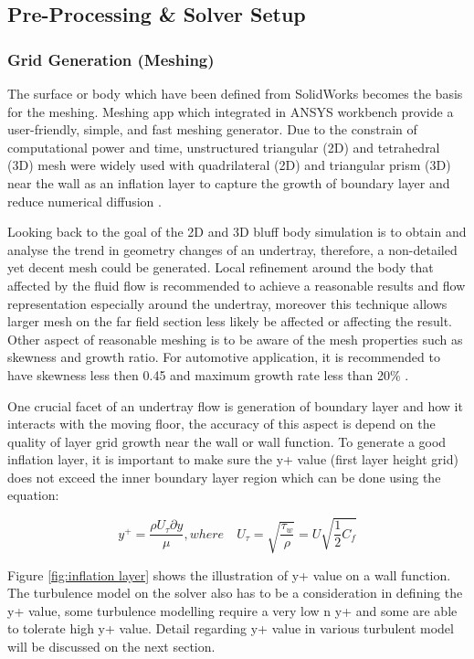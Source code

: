 \subsection{Pre-Processing \& Solver Setup}

\subsubsection{Grid Generation (Meshing)}
The surface or body which have been defined from SolidWorks becomes the basis for the meshing. Meshing app which integrated in ANSYS workbench provide a user-friendly, simple, and fast meshing generator. Due to the constrain of computational power and time, unstructured triangular (2D) and tetrahedral (3D) mesh were widely used with quadrilateral (2D) and triangular prism (3D) near the wall as an inflation layer to capture the growth of boundary layer and reduce numerical diffusion \cite{Lanfrit2005BestFLUENT}.

\noindent Looking back to the goal of the 2D and 3D bluff body simulation is to obtain and analyse the trend in geometry changes of an undertray, therefore, a non-detailed yet decent mesh could be generated. Local refinement around the body that affected by the fluid flow is recommended \cite{Lanfrit2005BestFLUENT} to achieve a reasonable results and flow representation especially around the undertray, moreover this technique allows larger mesh on the far field section less likely be affected or affecting the result. Other aspect of reasonable meshing is to be aware of the mesh properties such as skewness and growth ratio. For automotive application, it is recommended to have skewness less then 0.45 and maximum growth rate less than 20\% \cite{Lanfrit2005BestFLUENT}. 

\noindent One crucial facet of an undertray flow is generation of boundary layer and how it interacts with the moving floor, the accuracy of this aspect is depend on the quality of layer grid growth near the wall or wall function. To generate a good inflation layer, it is important to make sure the y+ value (first layer height grid) does not exceed the inner boundary layer region which can be done using the equation:

\begin{equation}
    y^+ = \frac{\rho U_\tau \partial y}{\mu}, where \quad U_\tau = \sqrt{\frac{\tau_w}{\rho}} = U \sqrt{\frac{1}{2}C_f}
\end{equation}

\noindent Figure \ref{fig:inflation layer} shows the illustration of y+ value on a wall function. The turbulence model on the solver also has to be a consideration in defining the y+ value, some turbulence modelling require a very low n y+ and some are able to tolerate high y+ value. Detail regarding y+ value in various turbulent model will be discussed on the next section. 

